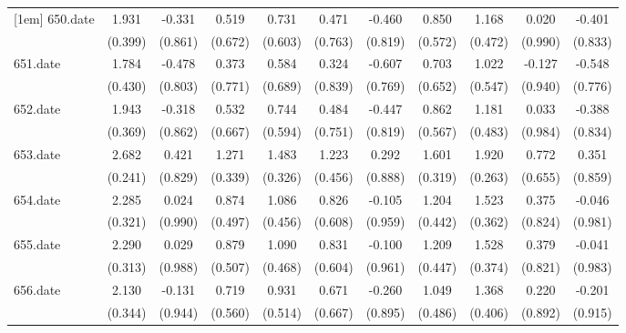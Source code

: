 \begin{tabular}{l*{10}{c}}
[1em]
650.date    &       1.931&      -0.331&       0.519&       0.731&       0.471&      -0.460&       0.850&       1.168&       0.020&      -0.401\\
            &     (0.399)&     (0.861)&     (0.672)&     (0.603)&     (0.763)&     (0.819)&     (0.572)&     (0.472)&     (0.990)&     (0.833)\\
[1em]
651.date    &       1.784&      -0.478&       0.373&       0.584&       0.324&      -0.607&       0.703&       1.022&      -0.127&      -0.548\\
            &     (0.430)&     (0.803)&     (0.771)&     (0.689)&     (0.839)&     (0.769)&     (0.652)&     (0.547)&     (0.940)&     (0.776)\\
[1em]
652.date    &       1.943&      -0.318&       0.532&       0.744&       0.484&      -0.447&       0.862&       1.181&       0.033&      -0.388\\
            &     (0.369)&     (0.862)&     (0.667)&     (0.594)&     (0.751)&     (0.819)&     (0.567)&     (0.483)&     (0.984)&     (0.834)\\
[1em]
653.date    &       2.682&       0.421&       1.271&       1.483&       1.223&       0.292&       1.601&       1.920&       0.772&       0.351\\
            &     (0.241)&     (0.829)&     (0.339)&     (0.326)&     (0.456)&     (0.888)&     (0.319)&     (0.263)&     (0.655)&     (0.859)\\
[1em]
654.date    &       2.285&       0.024&       0.874&       1.086&       0.826&      -0.105&       1.204&       1.523&       0.375&      -0.046\\
            &     (0.321)&     (0.990)&     (0.497)&     (0.456)&     (0.608)&     (0.959)&     (0.442)&     (0.362)&     (0.824)&     (0.981)\\
[1em]
655.date    &       2.290&       0.029&       0.879&       1.090&       0.831&      -0.100&       1.209&       1.528&       0.379&      -0.041\\
            &     (0.313)&     (0.988)&     (0.507)&     (0.468)&     (0.604)&     (0.961)&     (0.447)&     (0.374)&     (0.821)&     (0.983)\\
[1em]
656.date    &       2.130&      -0.131&       0.719&       0.931&       0.671&      -0.260&       1.049&       1.368&       0.220&      -0.201\\
            &     (0.344)&     (0.944)&     (0.560)&     (0.514)&     (0.667)&     (0.895)&     (0.486)&     (0.406)&     (0.892)&     (0.915)\\

\end{tabular}
